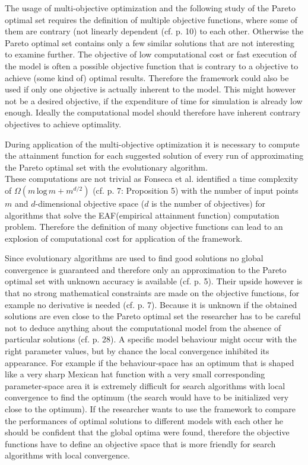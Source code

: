 \documentclass[12pt,twoside]{article}
\theoremstyle{plain}
\theoremstyle{definition}
\theoremstyle{remark}
\begin{document}
The usage of multi-objective optimization and the following study of the Pareto optimal set requires the definition of multiple objective functions, where some of them are contrary (not linearly dependent (cf. \cite{doncieux2015multi} p. 10) to each other. Otherwise the Pareto optimal set contains only a few similar solutions that are not interesting to examine further. The objective of low computational cost or fast execution of the model is often a possible objective function that is contrary to a objective to achieve (some kind of) optimal results. Therefore the framework could also be used if only one objective is actually inherent to the model. This might however not be a desired objective, if the expenditure of time for simulation is already low enough. Ideally the computational model should therefore have inherent contrary objectives to achieve optimality.\medskip

During application of the multi-objective optimization it is necessary to compute the attainment function for each suggested solution of every run of approximating the Pareto optimal set with the evolutionary algorithm.\\
These computations are not trivial as Fonseca et al. identified a time complexity of $\Omega(m\,\mbox{log}\,m+m^{d/2})$ (cf. \cite{fonseca2011computation} p. 7: Proposition 5) with the number of input points $m$ and $d$-dimensional objective space ($d$ is the number of objectives) for algorithms that solve the EAF(empirical attainment function) computation problem.
Therefore the definition of many objective functions can lead to an explosion of computational cost for application of the framework.\medskip

Since evolutionary algorithms are used to find good solutions no global convergence is guaranteed and therefore only an approximation to the Pareto optimal set with unknown accuracy is available (cf. \cite{doncieux2015multi} p. 5). Their upside however is that no strong mathematical constraints are made on the objective functions, for example no derivative is needed (cf. \cite{doncieux2015multi} p. 7).
Because it is unknown if the obtained solutions are even close to the Pareto optimal set the researcher has to be careful not to deduce anything about the computational model from the absence of particular solutions (cf. \cite{doncieux2015multi} p. 28).
A specific model behaviour might occur with the right parameter values, but by chance the local convergence inhibited its appearance.
For example if the behaviour-space has an optimum that is shaped like a very sharp Mexican hat function with a very small corresponding parameter-space area it is extremely difficult for search algorithms with local convergence to find the optimum (the search would have to be initialized very close to the optimum).
If the researcher wants to use the framework to compare the performances of optimal solutions to different models with each other he should be confident that the global optima were found, therefore the objective functions have to define an objective space that is more friendly for search algorithms with local convergence.\medskip
\end{document}
